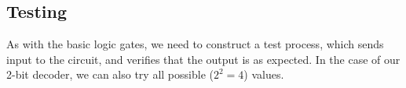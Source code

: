 \documentclass{beamer}
\begin{document}
\begin{frame}[fragile]
    
\end{frame}
\begin{frame}
    
\end{frame}

\subsection{Testing}
\begin{frame}
    As with the basic logic gates, we need to construct a test process, which
    sends input to the circuit, and verifies that the output is as expected. In
    the case of our 2-bit decoder, we can also try all possible ($2^2=4$)
    values.
\end{frame}


\AtBeginSection{}
\section*{}

%  
%  
\end{document}

